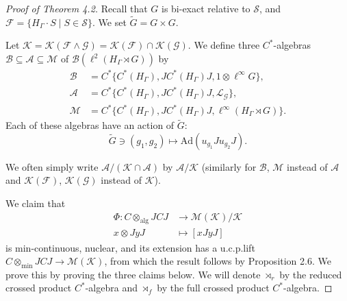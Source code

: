 \documentclass{amsart}
\theoremstyle{definition}
\newcommand{\Cstaralg}{$C^{\ast}$-algebra\xspace}
\newcommand{\Cstaralgs}{$C^{\ast}$-algebras\xspace}
\newcommand{\longto}{\longrightarrow}
\newcommand{\mintensor}{\otimes_{\mathrm{min}}}
\newcommand{\algtensor}{\otimes_{\mathrm{alg}}}
\begin{document}
\begin{proof}[Proof of Theorem 4.2]
Recall that $G$ is bi-exact relative to $\mathcal{S}$, and $\mathcal{F}=\{ H_{\Gamma}\cdot S\mid S\in \mathcal{S}\}$. 
We set $\tilde{G}=G\times G$. 

Let $\mathcal{K}=\mathcal{K}(\mathcal{F}\wedge\mathcal{G})=\mathcal{K}(\mathcal{F})\cap\mathcal{K}(\mathcal{G})$. 
We define three \Cstaralgs $\mathscr{B}\subseteq\mathscr{A}\subseteq\mathscr{M}$ 
of $\mathcal{B}(\ell^2(H_{\Gamma}\rtimes G))$ by
\begin{align}
\mathscr{B}&=C^{\ast} \{C^{\ast}(H_{\Gamma}), 
JC^{\ast}(H_{\Gamma})J, 1\otimes \ell^{\infty}G\}, \\
\mathscr{A}&=C^{\ast} \{C^{\ast}(H_{\Gamma}), 
JC^{\ast}(H_{\Gamma})J, \mathcal{L}_{\mathcal{G}}\}, \\
\mathscr{M}&=C^{\ast} \{C^{\ast}(H_{\Gamma}), 
JC^{\ast}(H_{\Gamma})J, \ell^{\infty}(H_{\Gamma}\rtimes G)\}. 
\end{align}
Each of these algebras have an action of $\tilde{G}$: 
\[
\tilde{G}\ni (g_1, g_2)\longmapsto \mathrm{Ad}(u_{g_1}Ju_{g_2}J). 
\]

We often simply write $\mathscr{A}/(\mathcal{K}\cap\mathscr{A})$
by $\mathscr{A}/\mathcal{K}$ (similarly for $\mathscr{B}$, $\mathscr{M}$ instead of $\mathscr{A}$
and $\mathcal{K}(\mathcal{F})$, $\mathcal{K}(\mathcal{G})$ instead of $\mathcal{K}$). 

We claim that
\begin{align}
\Phi : C\algtensor JCJ &\longto \mathcal{M}(\mathcal{K})/\mathcal{K} \tag{4.1}  \\
x\otimes JyJ &\longmapsto [xJyJ] 
\end{align}
is min-continuous, nuclear, and its extension has a u.c.p.\@ lift $C\mintensor JCJ\to \mathcal{M}(\mathcal{K})$, from which the result follows by Proposition 2.6. 
We prove this by proving the three claims below. 
We will denote $\rtimes_r$ by the reduced crossed product \Cstaralg
and $\rtimes_f$ by the full crossed product \Cstaralg. 




\end{proof}
\end{document}
